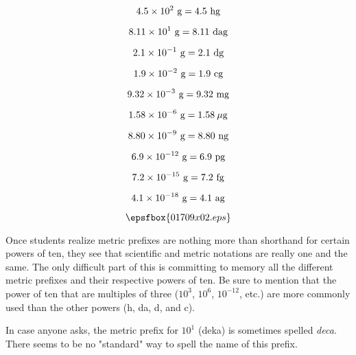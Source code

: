 $$4.5 \times 10^2 \hbox{ g} = 4.5 \hbox{ hg}$$

$$8.11 \times 10^1 \hbox{ g} = 8.11 \hbox{ dag}$$

$$2.1 \times 10^{-1} \hbox{ g} = 2.1 \hbox{ dg}$$

$$1.9 \times 10^{-2} \hbox{ g} = 1.9 \hbox{ cg}$$

$$9.32 \times 10^{-3} \hbox{ g} = 9.32 \hbox{ mg}$$

$$1.58 \times 10^{-6} \hbox{ g} = 1.58 \> \mu \hbox{g}$$

$$8.80 \times 10^{-9} \hbox{ g} = 8.80 \hbox{ ng}$$

$$6.9 \times 10^{-12} \hbox{ g} = 6.9 \hbox{ pg}$$

$$7.2 \times 10^{-15} \hbox{ g} = 7.2 \hbox{ fg}$$

$$4.1 \times 10^{-18} \hbox{ g} = 4.1 \hbox{ ag}$$

$$\epsfbox{01709x02.eps}$$







Once students realize metric prefixes are nothing more than shorthand for certain powers of ten, they see that scientific and metric notations are really one and the same.  The only difficult part of this is committing to memory all the different metric prefixes and their respective powers of ten.  Be sure to mention that the power of ten that are multiples of three ($10^{3}$, $10^{6}$, $10^{-12}$, etc.) are more commonly used than the other powers (h, da, d, and c).

In case anyone asks, the metric prefix for $10^1$ (deka) is sometimes spelled {\it deca}.  There seems to be no "standard" way to spell the name of this prefix.




